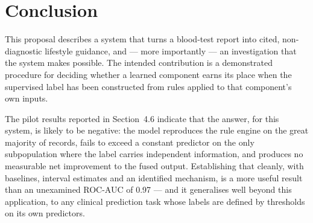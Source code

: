 \documentclass[11pt,a4paper]{article}
\begin{document}
\section{Conclusion}

This proposal describes a system that turns a blood-test report into cited,
non-diagnostic lifestyle guidance, and --- more importantly --- an investigation
that the system makes possible. The intended contribution is a demonstrated
procedure for deciding whether a learned component earns its place when the
supervised label has been constructed from rules applied to that component's own
inputs.

The pilot results reported in Section~4.6 indicate that the answer, for this
system, is likely to be negative: the model reproduces the rule engine on the great
majority of records, fails to exceed a constant predictor on the only subpopulation
where the label carries independent information, and produces no measurable net
improvement to the fused output. Establishing that cleanly, with baselines,
interval estimates and an identified mechanism, is a more useful result than an
unexamined ROC-AUC of 0.97 --- and it generalises well beyond this application, to
any clinical prediction task whose labels are defined by thresholds on its own
predictors.

\newpage
\end{document}

